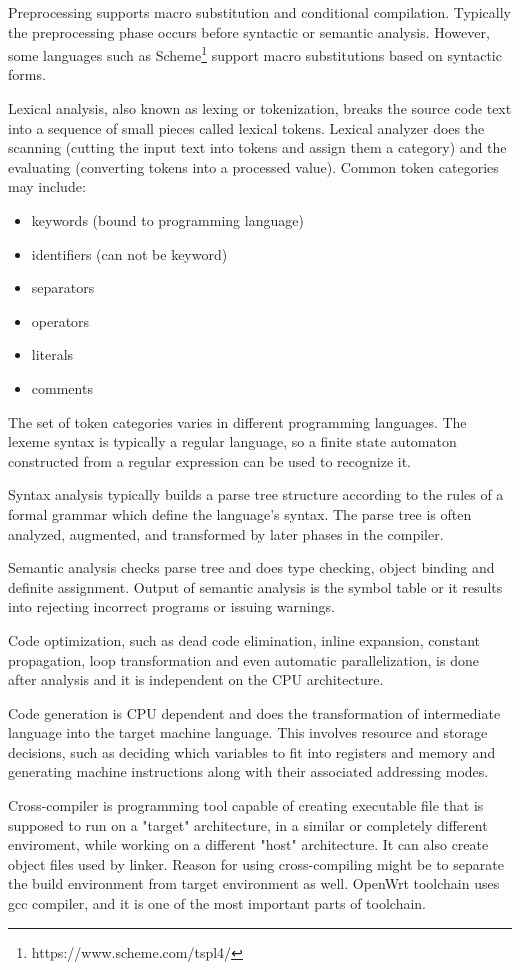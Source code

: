 Preprocessing supports macro substitution and conditional compilation.
Typically the preprocessing phase occurs before syntactic or semantic analysis.
However, some languages such as Scheme\footnote{https://www.scheme.com/tspl4/} support macro substitutions based on syntactic forms.

Lexical analysis, also known as lexing or tokenization, breaks the source code text into a sequence of small pieces called lexical tokens.
Lexical analyzer does the scanning (cutting the input text into tokens and assign them a category) and the evaluating (converting tokens into a processed value).
Common token categories may include:
\begin{itemize}
    \item keywords (bound to programming language)
    \item identifiers (can not be keyword)
    \item separators
    \item operators
    \item literals
    \item comments
\end{itemize}
The set of token categories varies in different programming languages.
The lexeme syntax is typically a regular language, so a finite state automaton constructed from a regular expression can be used to recognize it.

Syntax analysis typically builds a parse tree structure according to the rules of a formal grammar which define the language's syntax.
The parse tree is often analyzed, augmented, and transformed by later phases in the compiler.

Semantic analysis checks parse tree and does type checking, object binding and definite assignment.
Output of semantic analysis is the symbol table or it results into rejecting incorrect programs or issuing warnings.

Code optimization, such as dead code elimination, inline expansion, constant propagation, loop transformation and even automatic parallelization, is done after analysis and it is independent on the CPU architecture.

Code generation is CPU dependent and does the transformation of intermediate language into the target machine language.
This involves resource and storage decisions, such as deciding which variables to fit into registers and memory and generating machine instructions along with their associated addressing modes.

Cross-compiler is programming tool capable of creating executable file that is supposed to run on a "target" architecture, in a similar or completely different enviroment, while working on a different "host" architecture.
It can also create object files used by linker.
Reason for using cross-compiling might be to separate the build environment from target environment as well.
OpenWrt toolchain uses gcc compiler, and it is one of the most important parts of toolchain.

